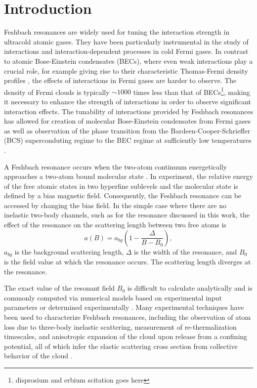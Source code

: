 \documentclass[12pt]{iopart}
\begin{document}
\section{Introduction}
Feshbach resonances are widely used for tuning the interaction strength in ultracold atomic gases. They have been particularly instrumental in the study of interactions and interaction-dependent processes in cold Fermi gases. In contrast to atomic Bose-Einstein condensates (BECs), where even weak interactions play a crucial role, for example giving rise to their characteristic Thomas-Fermi density profiles \cite{KetterleBEC}, the effects of interactions in Fermi gases are harder to observe. The density of Fermi clouds is typically $\sim1000$ times less than that of BECs\footnote{disprosium and erbium scitation goes here}, making it necessary to enhance the strength of interactions in order to observe significant interaction effects\cite{KetterleDFG}. The tunability of interactions provided by Feshbach resonances has allowed for creation of molecular Bose-Einstein condensates from Fermi gases \cite{Greiner03,Zwierlein03, Jochim03} as well as observation of the phase transition from the Bardeen-Cooper-Schrieffer (BCS) superconduting regime to the BEC regime at sufficiently low temperatures \cite{Bartenstein04, Bourdel04, Zwierlein04, Regal04}.
\par A Feshbach resonance occurs when the two-atom continuum energetically approaches a two-atom bound molecular state  \cite{Chin10, Timmermans99}. In experiment, the relative energy of the free atomic states in two hyperfine sublevels and the molecular state is defined by a bias magnetic field. Consequently, the Feshbach resonance can be accessed by changing the bias field. In the simple case where there are no inelastic two-body channels, such as for the \K{} resonance discussed in this work, the effect of the resonance on the scattering length between two free atoms is \cite{Chin10}
\begin{equation}
a(B)=a_{bg}\left(1-\frac{\Delta}{B-B_0}\right),
\label{feshbachEq}
\end{equation}
 $a_{bg}$ is the background scattering length, $\Delta$ is the width of the resonance, and $B_0$ is the field value at which the resonance occurs. The scattering length diverges at the resonance.
\par  The exact value of the resonant field $B_0$ is difficult to calculate analytically and is commonly computed via numerical models based on experimental input parameters \cite{Tiesinga93, Lysebo09, Gao11} or determined experimentally \cite{Inouye98, Cornish00}. Many experimental techniques have been used to characterize Feshbach resonances, including the observation of atom loss due to three-body inelastic scattering, measurement of re-thermalization timescales, and anisotropic expansion of the cloud upon release from a confining potential, all of which infer the elastic scattering cross section from collective behavior of the cloud \cite{Regal03,OHara02,Monroe93}.
\end{document}
